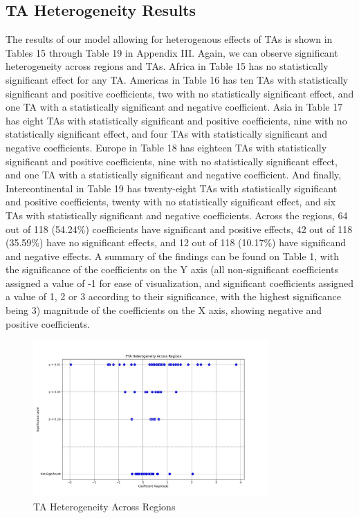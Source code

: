 \documentclass[12pt]{article}%
\begin{document}
\subsection{TA Heterogeneity Results}%
\label{subsec:TAHeterogeneityResults}%
The results of our model allowing for heterogenous effects of TAs is
shown in Tables 15 through Table 19 in Appendix III. Again, we can
observe significant heterogeneity across regions and TAs. Africa in
Table 15 has no statistically significant effect for any TA. Americas in
Table 16 has ten TAs with statistically significant and positive
coefficients, two with no statistically significant effect, and one TA
with a statistically significant and negative coefficient. Asia in Table
17 has eight TAs with statistically significant and positive
coefficients, nine with no statistically significant effect, and four
TAs with statistically significant and negative coefficients. Europe in
Table 18 has eighteen TAs with statistically significant and positive
coefficients, nine with no statistically significant effect, and one TA
with a statistically significant and negative coefficient. And finally,
Intercontinental in Table 19 has twenty-eight TAs with statistically
significant and positive coefficients, twenty with no statistically
significant effect, and six TAs with statistically significant and
negative coefficients. Across the regions, 64 out of 118 (54.24\%)
coefficients have significant and positive effects, 42 out of 118
(35.59\%) have no significant effects, and 12 out of 118 (10.17\%) have
significand and negative effects. A summary of the findings can be found
on Table 1, with the significance of the coefficients on the Y axis (all
non-significant coefficients assigned a value of -1 for ease of
visualization, and significant coefficients assigned a value of 1, 2 or
3 according to their significance, with the highest significance being
3) magnitude of the coefficients on the X axis, showing negative and
positive coefficients.
%


\begin{figure}[h!]%
\centering%
\includegraphics[width=0.8\textwidth]{figures/pta_het_vis.jpeg}%
\caption{TA Heterogeneity Across Regions}%
\end{figure}
\end{document}
